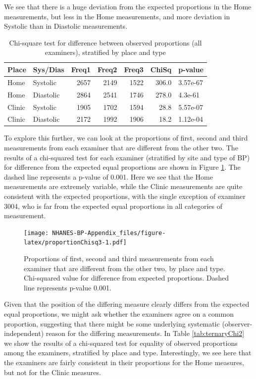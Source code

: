 \documentclass[
]{article}
\begin{document}
We see that there is a huge deviation from the expected proportions in the Home measurements, but less in the Home measurements, and more deviation in Systolic than in Diastolic measurements.

\begin{table}[!h]

\caption{\label{tab:proportionChisq}Chi-square test for difference between observed proportions (all examiners), stratified by place and type}
\centering
\begin{tabular}[t]{llrrrrl}
\toprule
Place & Sys/Dias & Freq1 & Freq2 & Freq3 & ChiSq & p-value\\
\midrule
Home & Systolic & 2657 & 2149 & 1522 & 306.0 & 3.57e-67\\
Home & Diastolic & 2864 & 2541 & 1746 & 278.0 & 4.3e-61\\
Clinic & Systolic & 1905 & 1702 & 1594 & 28.8 & 5.57e-07\\
Clinic & Diastolic & 2172 & 1992 & 1906 & 18.2 & 1.12e-04\\
\bottomrule
\end{tabular}
\end{table}

To explore this further, we can look at the proportions of first, second and third measurements from each examiner that are different from the other two.
The results of a chi-squared test for each examiner (stratified by site and type of BP) for difference from the expected equal proportions are shown in Figure \ref{fig:proportionChisq3}.
The dashed line represents a p-value of 0.001.
Here we see that the Home measurements are extremely variable, while the Clinic measurements are quite consistent with the expected proportions, with the single exception of examiner 3004, who is far from the expected equal proportions in all categories of measurement.

\begin{figure}
\centering
\texttt{[image: NHANES-BP-Appendix\_files/figure-latex/proportionChisq3-1.pdf]}
\caption{\label{fig:proportionChisq3}Proportions of first, second and third measurements from each examiner that are different from the other two, by place and type. Chi-squared value for difference from expected proportions. Dashed line represents p-value 0.001.}
\end{figure}

Given that the position of the differing measure clearly differs from the expected equal proportions, we might ask whether the examiners agree on a common proportion, suggesting that there might be some underlying systematic (observer-independent) reason for the differing measurements.
In Table \ref{tab:ternaryChi2} we show the results of a chi-squared test for equality of observed proportions among the examiners, stratified by place and type.
Interestingly, we see here that the examiners are fairly consistent in their proportions for the Home measures, but not for the Clinic measures.
\end{document}
